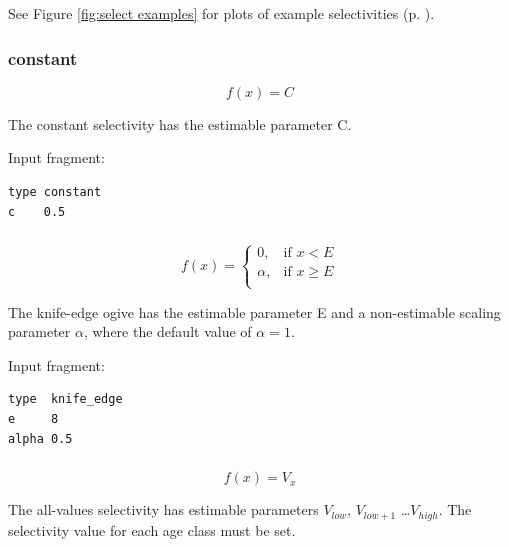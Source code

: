 See Figure \ref{fig:select examples} for plots of example selectivities (p. \pageref{fig:select examples}).

\subsubsection[Constant]{{constant}}\label{sec:Selectivity-Constant}

\begin{equation}
f(x)=C
\end{equation}

The constant selectivity has the estimable parameter C.

Input fragment: {\small{\begin{verbatim}
type constant
c    0.5
\end{verbatim}}}

\subsubsection[Knife-edge]{}\label{sec:Selectivity-KnifeEdge} 

\begin{equation}
f(x)= \begin{cases}
  0, & \text{if $x < E$} \\
  \alpha, & \text{if $x \ge E$}\\
  \end{cases}
\end{equation}

The knife-edge ogive has the estimable parameter E and a non-estimable scaling parameter $\alpha$, where the default value of $\alpha = 1$.

Input fragment: {\small{\begin{verbatim}
type  knife_edge
e     8
alpha 0.5
\end{verbatim}}}

\subsubsection[All-values]{}\label{sec:Selectivity-AllValues}

\begin{equation}
f(x)=V_x
\end{equation}

The all-values selectivity has estimable parameters $V_{low}$, $V_{low+1}$ \ldots $V_{high}$. The selectivity value for each age class must be set.

